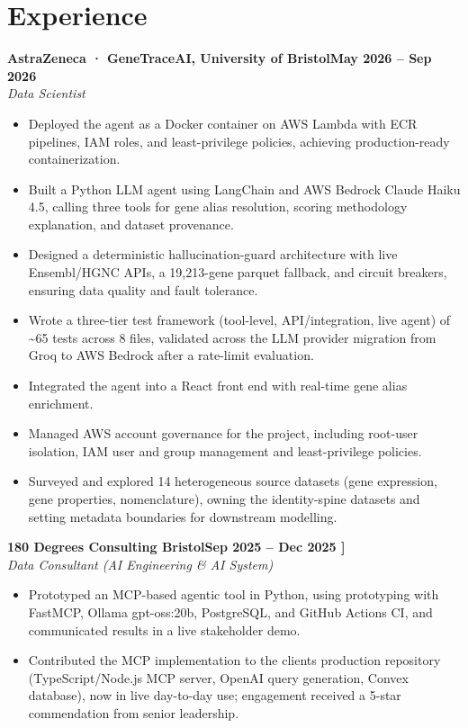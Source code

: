 \documentclass[a4paper,11pt]{article}
\newcommand{\entry}[4]{\needspace{4\baselineskip}\noindent\textbf{#1}\hfill\textbf{#2}\\ \textit{#3}\hfill\textit{#4}\par}
\begin{document}
\section{Experience}
\entry{AstraZeneca · GeneTraceAI, University of Bristol}{May 2026 – Sep 2026}{Data Scientist}{}
\begin{itemize}
  \item Deployed the agent as a Docker container on AWS Lambda with ECR pipelines, IAM roles, and least-privilege policies, achieving production-ready containerization.
  \item Built a Python LLM agent using LangChain and AWS Bedrock Claude Haiku 4.5, calling three tools for gene alias resolution, scoring methodology explanation, and dataset provenance.
  \item Designed a deterministic hallucination-guard architecture with live Ensembl/HGNC APIs, a 19,213-gene parquet fallback, and circuit breakers, ensuring data quality and fault tolerance.
  \item Wrote a three-tier test framework (tool-level, API/integration, live agent) of \textasciitilde{}65 tests across 8 files, validated across the LLM provider migration from Groq to AWS Bedrock after a rate-limit evaluation.
  \item Integrated the agent into a React front end with real-time gene alias enrichment.
  \item Managed AWS account governance for the project, including root-user isolation, IAM user and group management and least-privilege policies.
  \item Surveyed and explored 14 heterogeneous source datasets (gene expression, gene properties, nomenclature), owning the identity-spine datasets and setting metadata boundaries for downstream modelling.
\end{itemize}
\vspace{4pt}
\entry{180 Degrees Consulting Bristol}{Sep 2025 – Dec 2025   ]}{Data Consultant (AI Engineering \& AI System)}{}
\begin{itemize}
  \item Prototyped an MCP-based agentic tool in Python, using prototyping with FastMCP, Ollama gpt-oss:20b, PostgreSQL, and GitHub Actions CI, and communicated results in a live stakeholder demo.
  \item Contributed the MCP implementation to the client\textquotesingle{}s production repository (TypeScript/Node.js MCP server, OpenAI query generation, Convex database), now in live day-to-day use; engagement received a 5-star commendation from senior leadership.
\end{itemize}
\end{document}
